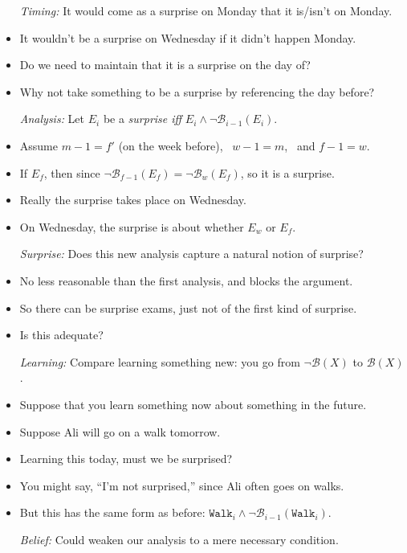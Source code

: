 \documentclass[a4paper, 11pt]{article} %
\newcommand{\B}{\mathcal{B}}
\newcommand{\B}{\mathfrak{B}}
\begin{document}
\begin{itemize}
  \item[\it Timing:] It would come as a surprise on Monday that it is/isn't on Monday.
    \item It wouldn't be a surprise on Wednesday if it didn't happen Monday.
    \item Do we need to maintain that it is a surprise on the day of?
    \item Why not take something to be a surprise by referencing the day before?
  \item[\it Analysis:] Let $E_i$ be a \textit{surprise iff} $E_i \wedge \neg \B_{i-1}(E_i)$.
    \item Assume $m-1 = f'$ (on the week before),~ $w-1=m$,~ and $f-1=w$. 
    \item If $E_f$, then since $\neg \B_{f-1}(E_f) = \neg \B_{w}(E_f)$, so it is a surprise.
    \item Really the surprise takes place on Wednesday.
    \item On Wednesday, the surprise is about whether $E_w$ or $E_f$. 
  \item[\it Surprise:] Does this new analysis capture a natural notion of surprise?
    \item No less reasonable than the first analysis, and blocks the argument.
    \item So there can be surprise exams, just not of the first kind of surprise.
    \item Is this adequate?
  \item[\it Learning:] Compare learning something new: you go from $\neg \B(X)$ to $\B(X)$.
    \item Suppose that you learn something now about something in the future.
    \item Suppose Ali will go on a walk tomorrow.
    \item Learning this today, must we be surprised?
    \item You might say, ``I'm not surprised,'' since Ali often goes on walks.
    \item But this has the same form as before: $\texttt{Walk}_i \wedge \neg \B_{i-1}(\texttt{Walk}_i)$.
  \item[\it Belief:] Could weaken our analysis to a mere necessary condition.

\end{itemize}
\end{document}
